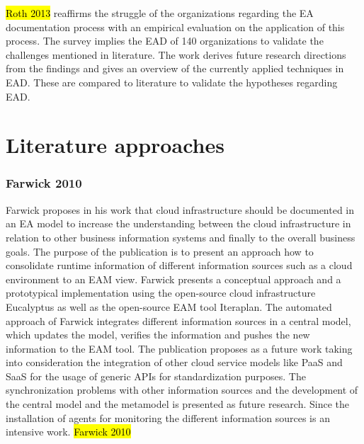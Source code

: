 \hl{Roth 2013} reaffirms the struggle of the organizations regarding the EA documentation process with an empirical evaluation on the application of this process. The survey implies the EAD of 140 organizations to validate the challenges mentioned in literature. The work derives future research directions from the findings and gives an overview of the currently applied techniques in EAD. These are compared to literature to validate the hypotheses regarding EAD.


\section{Literature approaches}

\subsubsection{Farwick 2010}

Farwick proposes in his work that cloud infrastructure should be documented in an EA model to increase the understanding between the cloud infrastructure in relation to other business information systems and finally to the overall business goals. The purpose of the publication is to present an approach how to consolidate runtime information of different information sources such as a cloud environment to an EAM view. Farwick presents a conceptual approach and a prototypical implementation using the open-source cloud infrastructure Eucalyptus as well as the open-source EAM tool Iteraplan. The automated approach of Farwick integrates different information sources in a central model, which updates the model, verifies the information and pushes the new information to the EAM tool. The publication proposes as a future work taking into consideration the integration of other cloud service models like PaaS and SaaS for the usage of generic APIs for standardization purposes. The synchronization problems with other information sources and the development of the central model and the metamodel is presented as future research. Since the installation of agents for monitoring the different information sources is an intensive work. \hl{Farwick 2010}

